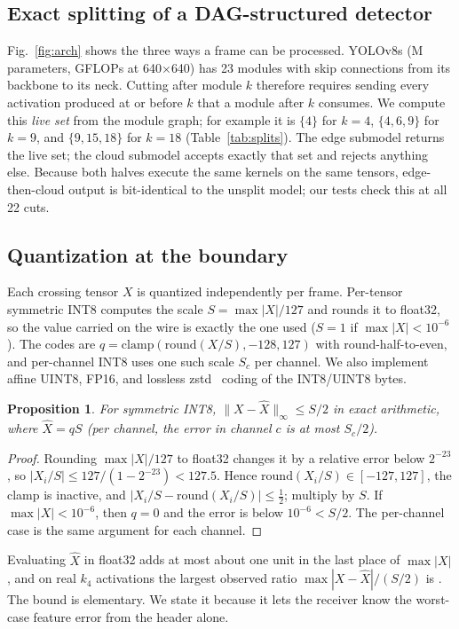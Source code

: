 \documentclass[journal,twocolumn,10pt]{IEEEtran}
\newtheorem{proposition}{Proposition}
\begin{document}
\subsection{Exact splitting of a DAG-structured detector}
Fig.~\ref{fig:arch} shows the three ways a frame can be processed. YOLOv8s (\TotalParamsM{}M parameters, \TotalGFLOPs{} GFLOPs at 640$\times$640) has 23 modules with skip connections from its backbone to its neck. Cutting after module $k$ therefore requires sending every activation produced at or before $k$ that a module after $k$ consumes. We compute this \emph{live set} from the module graph; for example it is $\{4\}$ for $k{=}4$, $\{4,6,9\}$ for $k{=}9$, and $\{9,15,18\}$ for $k{=}18$ (Table~\ref{tab:splits}). The edge submodel returns the live set; the cloud submodel accepts exactly that set and rejects anything else. Because both halves execute the same kernels on the same tensors, edge-then-cloud output is bit-identical to the unsplit model; our tests check this at all 22 cuts.

\subsection{Quantization at the boundary}
Each crossing tensor $X$ is quantized independently per frame. Per-tensor symmetric INT8 computes the scale $S=\max|X|/127$ and rounds it to float32, so the value carried on the wire is exactly the one used ($S=1$ if $\max|X|<10^{-6}$). The codes are $q=\mathrm{clamp}(\mathrm{round}(X/S),-128,127)$ with round-half-to-even, and per-channel INT8 uses one such scale $S_c$ per channel. We also implement affine UINT8, FP16, and lossless zstd~\cite{rfc8878zstd} coding of the INT8/UINT8 bytes.
\begin{proposition}\label{prop:int8}
For symmetric INT8, $\|X-\hat X\|_\infty \le S/2$ in exact arithmetic, where $\hat X = qS$ (per channel, the error in channel $c$ is at most $S_c/2$).
\end{proposition}
\begin{proof}
Rounding $\max|X|/127$ to float32 changes it by a relative error below $2^{-23}$, so $|X_i/S|\le127/(1-2^{-23})<127.5$. Hence $\mathrm{round}(X_i/S)\in[-127,127]$, the clamp is inactive, and $|X_i/S-\mathrm{round}(X_i/S)|\le\frac12$; multiply by $S$. If $\max|X|<10^{-6}$, then $q=0$ and the error is below $10^{-6}<S/2$. The per-channel case is the same argument for each channel.
\end{proof}
Evaluating $\hat X$ in float32 adds at most about one unit in the last place of $\max|X|$, and on real $k_4$ activations the largest observed ratio $\max|X-\hat X|/(S/2)$ is \BoundRatioMax{}. The bound is elementary. We state it because it lets the receiver know the worst-case feature error from the header alone.
\end{document}
